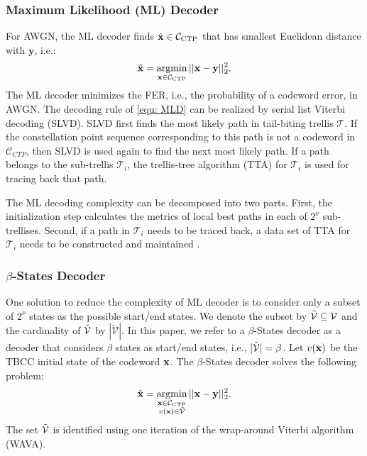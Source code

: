 \documentclass [PhD] {uclathes}
\DeclareMathOperator*{\argminB}{argmin}   %
\begin{document}
\subsubsection{Maximum Likelihood (ML) Decoder}  For AWGN, the ML decoder finds $\hat{\mathbf{x}}\in\mathcal{C}_{\mathrm{CTP}}$ that has smallest Euclidean distance with $\mathbf{y}$, i.e.:
\begin{align}\label{equ: MLD}
    \hat{\chaninsy}=\argminB_{\chaninsy\in\mathcal{C}_{\mathrm{CTP}}}||\chaninsy-\mathbf{y}||_2^2.
\end{align}
The ML decoder minimizes the FER, i.e., the probability of a codeword error, in AWGN.  The decoding rule of \eqref{equ: MLD} can be realized by serial list Viterbi decoding (SLVD)\cite{seshadri1994list}.
SLVD first finds the most likely path in tail-biting trellis $\mathcal{T}$. If the
constellation point sequence corresponding to this path is not a codeword in $\mathcal{C}_{CTP}$, then SLVD is used again to find the next most likely path. If a path belongs to the sub-trellis $\mathcal{T}_i$, the  trellis-tree algorithm (TTA) \cite{soong1990fast} for $\mathcal{T}_i$ is used for tracing back that path.


The ML decoding complexity can be decomposed into two parts. First, the initialization step calculates the metrics of local best paths in each of $2^\nu$ sub-trellises. Second, if a path in $\mathcal{T}_i$ needs to be traced back, a data set of TTA for 
 $\mathcal{T}_i$ needs to be constructed and maintained \cite{soong1990fast}.

 \subsubsection{$\beta$-States Decoder}  
 One solution to reduce the complexity of ML decoder is to consider only a subset of $2^\nu$ states as the possible start/end states. We denote the subset by $\Tilde{\mathcal{V}}\subseteq\mathcal{V}$ and the cardinality of  $\Tilde{\mathcal{V}}$ by $|\tilde{\mathcal{V}}|$. In this paper, we refer to a $\beta$-States decoder as a decoder that considers $\beta$ states as start/end states, i.e., $|\Tilde{\mathcal{V}}|=\beta$. Let $v(\mathbf{x})$ be the TBCC initial state of  the codeword $\mathbf{x}$.  The $\beta$-States decoder solves the following problem:
\begin{align}\label{equ: bSD}
    \hat{\chaninsy}=\argminB_{\substack{{\chaninsy}\in\mathcal{C}_{\mathrm{CTP}}\\v(\chaninsy)\in\Tilde{\mathcal{V}}} }||\chaninsy-\mathbf{y}||_2^2.
\end{align}
The set $\Tilde{\mathcal{V}}$ is identified using one iteration of the wrap-around Viterbi algorithm (WAVA)\cite{rosewava}. 
\end{document}
